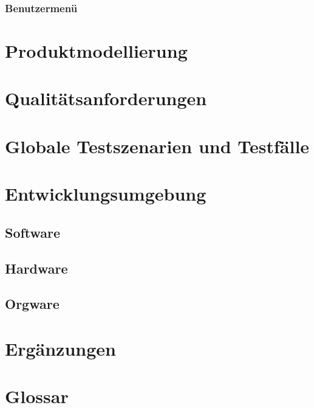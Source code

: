 \subsubsection{Benutzermenü}
\section{Produktmodellierung}
\section{Qualitätsanforderungen}
\section{Globale Testszenarien und Testfälle}
\section{Entwicklungsumgebung}
\subsection{Software}
\subsection{Hardware}
\subsection{Orgware}
\section{Ergänzungen}
\section{Glossar}
